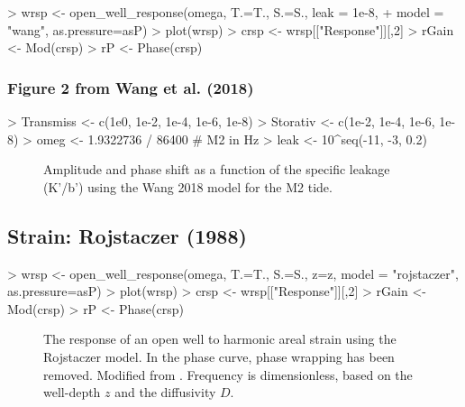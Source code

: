 \documentclass[12pt]{article}
\begin{document}
\begin{Schunk}
\begin{Sinput}
> wrsp <- open_well_response(omega, T.=T., S.=S., leak = 1e-8,
+                            model = "wang", as.pressure=asP)
> plot(wrsp)
> crsp <- wrsp[["Response"]][,2]
> rGain <- Mod(crsp)
> rP <- Phase(crsp)
\end{Sinput}
\end{Schunk}

\clearpage
\subsubsection{Figure 2 from Wang et al. (2018)}

\begin{Schunk}
\begin{Sinput}
> Transmiss <- c(1e0, 1e-2, 1e-4, 1e-6, 1e-8)
> Storativ  <- c(1e-2, 1e-4, 1e-6, 1e-8)
> omeg      <- 1.9322736 / 86400 # M2 in Hz
> leak      <- 10^seq(-11, -3, 0.2)
\end{Sinput}
\end{Schunk}

\begin{figure}[htb!]
\begin{center}
\caption{Amplitude and phase shift as a function of the specific leakage (K'/b') using the Wang 2018 model for the M2 tide.}
\label{fig:owrsp-wang}
\end{center}
\end{figure}



\clearpage
\subsection{Strain: Rojstaczer (1988)}

\begin{Schunk}
\begin{Sinput}
> wrsp <- open_well_response(omega, T.=T., S.=S., z=z, model = "rojstaczer", as.pressure=asP)
> plot(wrsp)
> crsp <- wrsp[["Response"]][,2]
> rGain <- Mod(crsp)
> rP <- Phase(crsp)
\end{Sinput}
\end{Schunk}

\begin{figure}[htb!]
\begin{center}
\caption{The response of an open well to harmonic areal strain using
the Rojstaczer model. In the phase curve, phase wrapping has been removed.
Modified from \citet[][Fig.~3]{rojstaczer1988}.
Frequency is dimensionless, based on the well-depth $z$ and the diffusivity
$D$.}
\label{fig:owrsp-roj}
\end{center}
\end{figure}
\end{document}
